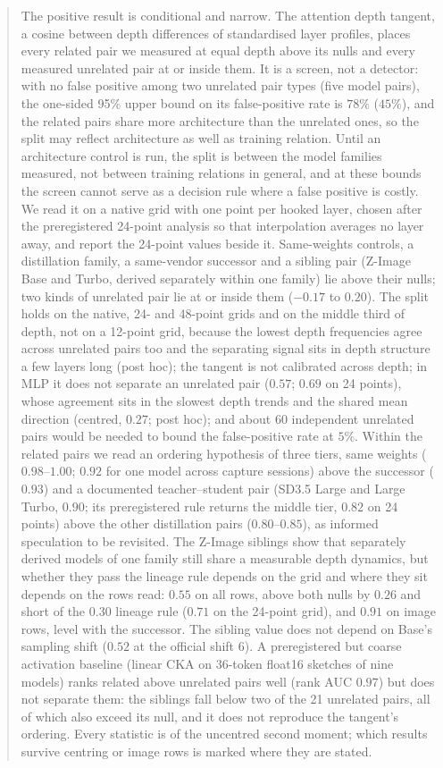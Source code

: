 \documentclass[11pt]{article}
\begin{document}
\begin{abstract}
The positive result is conditional and narrow. The attention depth tangent, a cosine between depth differences of standardised layer profiles, places every related pair we measured at equal depth above its nulls and every measured unrelated pair at or inside them. It is a screen, not a detector: with no false positive among two unrelated pair types (five model pairs), the one-sided 95\% upper bound on its false-positive rate is $78\%$ ($45\%$), and the related pairs share more architecture than the unrelated ones, so the split may reflect architecture as well as training relation. Until an architecture control is run, the split is between the model families measured, not between training relations in general, and at these bounds the screen cannot serve as a decision rule where a false positive is costly. We read it on a native grid with one point per hooked layer, chosen after the preregistered 24-point analysis so that interpolation averages no layer away, and report the 24-point values beside it. Same-weights controls, a distillation family, a same-vendor successor and a sibling pair (Z-Image Base and Turbo, derived separately within one family) lie above their nulls; two kinds of unrelated pair lie at or inside them ($-0.17$ to $0.20$). The split holds on the native, 24- and 48-point grids and on the middle third of depth, not on a 12-point grid, because the lowest depth frequencies agree across unrelated pairs too and the separating signal sits in depth structure a few layers long (post hoc); the tangent is not calibrated across depth; in MLP it does not separate an unrelated pair ($0.57$; $0.69$ on 24 points), whose agreement sits in the slowest depth trends and the shared mean direction (centred, $0.27$; post hoc); and about 60 independent unrelated pairs would be needed to bound the false-positive rate at $5\%$. Within the related pairs we read an ordering hypothesis of three tiers, same weights ($0.98$--$1.00$; $0.92$ for one model across capture sessions) above the successor ($0.93$) and a documented teacher--student pair (SD3.5 Large and Large Turbo, $0.90$; its preregistered rule returns the middle tier, $0.82$ on 24 points) above the other distillation pairs ($0.80$--$0.85$), as informed speculation to be revisited. The Z-Image siblings show that separately derived models of one family still share a measurable depth dynamics, but whether they pass the lineage rule depends on the grid and where they sit depends on the rows read: $0.55$ on all rows, above both nulls by $0.26$ and short of the $0.30$ lineage rule ($0.71$ on the 24-point grid), and $0.91$ on image rows, level with the successor. The sibling value does not depend on Base's sampling shift ($0.52$ at the official shift $6$). A preregistered but coarse activation baseline (linear CKA on 36-token float16 sketches of nine models) ranks related above unrelated pairs well (rank AUC $0.97$) but does not separate them: the siblings fall below two of the 21 unrelated pairs, all of which also exceed its null, and it does not reproduce the tangent's ordering. Every statistic is of the uncentred second moment; which results survive centring or image rows is marked where they are stated.


\end{abstract}
\end{document}
